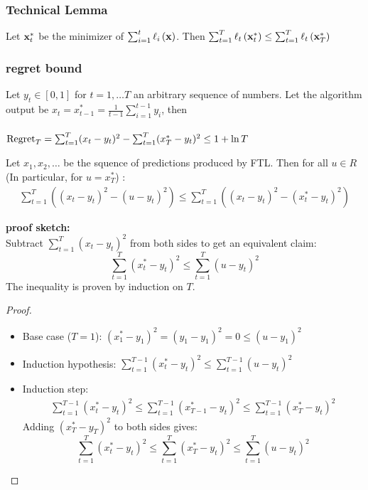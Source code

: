 \documentclass{beamer}
\begin{document}
\begin{frame}
\frametitle{Technical Lemma}
\begin{lemma}
  Let $\vx_t^*$ be the minimizer of $\sum_{i=1}^t \elloss{\vx}{i}$. Then
$  \sum_{t=1}^T \elloss{\vx_t^*}{t} \leq \sum_{t=1}^T \elloss{\vx_T^*}{t}$
  \end{lemma}
\end{frame}
\fi
\begin{frame}
\frametitle{regret bound}
\begin{theorem}
Let $y_t \in [0,1]$ for $t=1,\ldots T$ an arbitrary sequence of
numbers. Let the algorithm output be
$ x_t = x_{t-1}^* = \frac{1}{t-1} \sum_{i=1}^{t-1} y_i$, then\\
~\\
$ \regret_T = \sum_{t=1}^T (x_t-y_t)^2 - \sum_{t=1}^T (x^*_T-y_t)^2
\leq 1 + \ln T$
\end{theorem}
\end{frame}

\begin{frame}
  \begin{lemma}
    Let $x_1, x_2,\ldots$ be the squence of predictions produced by FTL. Then for all $u \in R$ (In particular, for $u=x^*_T$) :
    \begin{eqnarray*}
	\sum_{t=1}^T \left( (x_t-y_t)^2 - (u - y_t)^2\right) \leq  \sum_{t=1}^T \left( (x_t-y_t)^2 - (x^*_t- y_t)^2\right)
    \end{eqnarray*}
  \end{lemma}
  {\bf proof sketch:}\\
  Subtract $\sum_{t=1}^T (x_t-y_t)^2$ from both sides to get an equivalent claim:
  \[
    \sum_{t=1}^T (x^*_t- y_t)^2 \leq \sum_{t=1}^T (u - y_t)^2
  \]
The inequality is proven by induction on $T$.
\end{frame}

\begin{frame}
\begin{proof}
\begin{itemize}
\item Base case ($T=1$): $(x^*_1 - y_1)^2 = (y_1 - y_1)^2 = 0 \le (u-y_1)^2$
\item Induction hypothesis: $\sum_{t=1}^{T-1}(x^*_t - y_t)^2 \leq \sum_{t=1}^{T-1} (u - y_t)^2$
\item Induction step:
    \begin{eqnarray*}
    	\sum_{t=1}^{T-1}(x^*_t - y_t)^2 \leq \sum_{t=1}^{T-1}(x^*_{T-1} - y_t)^2 \leq \sum_{t=1}^{T-1}(x^*_{T} - y_t)^2
    \end{eqnarray*}
    Adding $(x^*_T - y_T)^2$ to both sides gives: $$\sum_{t=1}^{T}(x^*_t - y_t)^2 \leq \sum_{t=1}^{T} (x^*_{T} - y_t)^2  \leq \sum_{t=1}^{T} (u - y_t)^2$$
\end{itemize}
\end{proof}
\end{frame}
\end{document}
